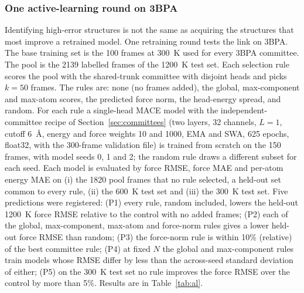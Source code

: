 \subsubsection{One active-learning round on 3BPA}

Identifying high-error structures is not the same as acquiring the structures
that most improve a retrained model. One retraining round tests the link on
3BPA. The base training set is the 100 frames at 300~K used for every 3BPA
committee. The pool is the 2139 labelled frames of the 1200~K test set. Each
selection rule scores the pool with the shared-trunk committee with disjoint
heads and picks $k=50$ frames. The rules are: none (no frames added), the
global, max-component and max-atom scores, the predicted force norm, the
head-energy spread, and random. For each rule a single-head MACE model with
the independent-committee recipe of Section~\ref{sec:committees} (two layers,
32 channels, $L=1$, cutoff 6~\AA, energy and force weights 10 and 1000, EMA and
SWA, 625 epochs, float32, with the 300-frame validation file) is trained from
scratch on the 150 frames, with model seeds 0, 1 and 2; the random rule draws
a different subset for each seed. Each model is evaluated by force RMSE, force
MAE and per-atom energy MAE on (i) the 1820 pool frames that no rule selected,
a held-out set common to every rule, (ii) the 600~K test set and (iii) the
300~K test set. Five predictions were registered: (P1) every rule, random
included, lowers the held-out 1200~K force RMSE relative to the control with no
added frames; (P2) each of the global, max-component, max-atom and force-norm
rules gives a lower held-out force RMSE than random; (P3) the force-norm rule
is within 10\% (relative) of the best committee rule; (P4) at fixed $N$ the
global and max-component rules train models whose RMSE differ by less than the
across-seed standard deviation of either; (P5) on the 300~K test set no rule
improves the force RMSE over the control by more than 5\%. Results are in
Table~\ref{tab:al}.

